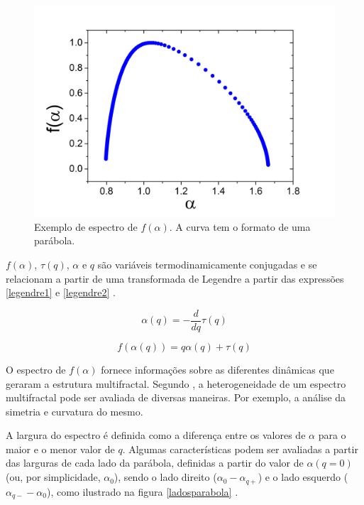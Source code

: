 \documentclass{ufscThesis}
\begin{document}
\begin{figure}[!h]
\centering
\includegraphics[scale=0.3]{alphaf.png}
\caption{Exemplo de espectro de $f(\alpha)$. A curva tem o formato de uma parábola.}
\label{alphaf}
\end{figure}

$f(\alpha)$, $\tau(q)$, $\alpha$ e $q$ são variáveis termodinamicamente conjugadas e se relacionam a partir de uma transformada de Legendre a partir das expressões \ref{legendre1} e \ref{legendre2} \cite{Biswas2012,feder1988fractals, Gu2010,Chhabra1989}.

\begin{equation}
\alpha(q) = - \frac{d}{dq}\tau(q)
\label{legendre1}
\end{equation}

\begin{equation}
f(\alpha(q)) = q\alpha(q) + \tau(q)
\label{legendre2}
\end{equation}

O espectro de $f(\alpha)$ fornece informações sobre as diferentes dinâmicas que geraram a estrutura multifractal. Segundo , a heterogeneidade de um espectro multifractal pode ser avaliada de diversas maneiras. Por exemplo, a análise da simetria e curvatura do mesmo. \par
A largura do espectro é definida como a diferença entre os valores de $\alpha$ para o maior e o menor valor de $q$. Algumas características podem ser avaliadas a partir das larguras de cada lado da parábola, definidas a partir do valor de $\alpha(q=0)$ (ou, por simplicidade, $\alpha_{0}$), sendo o lado direito ($\alpha_{0} - \alpha_{q+}$) e o lado esquerdo ($\alpha_{q-} - \alpha_{0}$), como ilustrado na figura \ref{ladosparabola} \cite{Miranda2006}.
\end{document}
